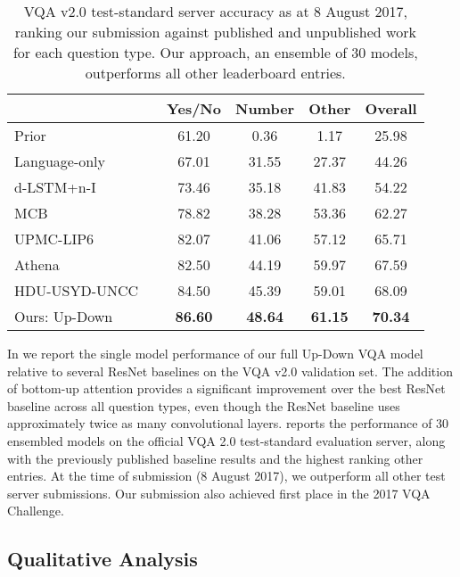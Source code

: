 \documentclass[10pt,twocolumn,letterpaper]{article}
\begin{document}
\begin{table}[t]
\small
\centering
\setlength{\tabcolsep}{.5em}
\begin{tabular}{llcccc}
\midrule
                                    &    &   Yes/No  &  Number   &  Other & Overall  \\
\midrule
Prior~\cite{balanced_vqa_v2} &						 & 61.20	& 0.36	& 1.17	& 25.98\\
Language-only~\cite{balanced_vqa_v2} &									 & 67.01	& 31.55	& 27.37	& 44.26\\
d-LSTM+n-I~\cite{lu2015deeperLstm,balanced_vqa_v2} &		 & 73.46	& 35.18	& 41.83 & 54.22	\\
MCB~\cite{fukui2016multimodal,balanced_vqa_v2} &					 & 78.82	& 38.28	& 53.36	& 62.27\\
UPMC-LIP6 &    			 & 82.07	& 41.06	& 57.12 & 65.71	\\
Athena &   				 & 82.50	& 44.19	& 59.97	& 67.59 \\
HDU-USYD-UNCC &			 & 84.50	& 45.39	& 59.01 & 68.09	\\
Ours: Up-Down  &  & \textbf{86.60} & \textbf{48.64} & \textbf{61.15} & \textbf{70.34}\\
\midrule
\end{tabular}
\caption{VQA v2.0 test-standard server accuracy as at 8 August 2017, ranking our submission against published and unpublished work for each question type. Our approach, an ensemble of 30 models, outperforms all other leaderboard entries.}
\label{tab:vqa_test}
\end{table}


In  we report the single model performance of our full Up-Down VQA model relative to several ResNet baselines on the VQA v2.0 validation set. The addition of bottom-up attention provides a significant improvement over the best ResNet baseline across all question types, even though the ResNet baseline uses approximately twice as many convolutional layers.   reports the performance of 30 ensembled models on the official VQA 2.0 test-standard evaluation server, along with the previously published baseline results and the highest ranking other entries. At the time of submission (8 August 2017), we outperform all other test server submissions. Our submission also achieved first place in the 2017 VQA Challenge.


\subsection{Qualitative Analysis}
\end{document}
